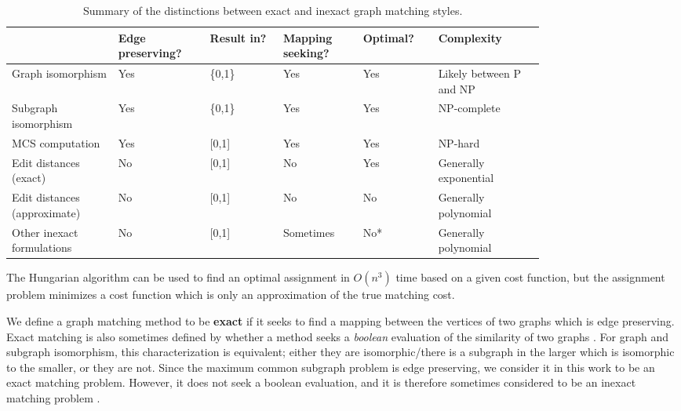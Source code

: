 \documentclass[12pt]{thesis}
\theoremstyle{plain}
\theoremstyle{definition}
\theoremstyle{remark}
\begin{document}
\begin{table}[h]
\centering
\begin{tabular}{|L{0.16\linewidth}|L{0.13\linewidth}|L{0.11\linewidth}|L{0.12\linewidth}|L{0.105\linewidth}|L{0.165\linewidth}|}
\hline
 & Edge preserving? & Result in? & Mapping seeking? & Optimal? & Complexity \\ \hline
Graph isomorphism & Yes & \{0,1\} & Yes & Yes & Likely between P and NP \\ \hline
Subgraph isomorphism & Yes & \{0,1\} & Yes & Yes & NP-complete \\ \hline
MCS computation & Yes & [0,1] & Yes & Yes & NP-hard \\ \hline
Edit distances (exact) & No & [0,1] & No & Yes & Generally exponential \\ \hline
Edit distances (approximate) & No & [0,1] & No & No & Generally polynomial \\ \hline
Other inexact formulations & No & [0,1] & Sometimes & No* & Generally polynomial \\ \hline
\end{tabular}
\caption{Summary of the distinctions between exact and inexact graph matching styles.}
\footnotesize *The Hungarian algorithm can be used to find an optimal assignment in $O(n^3)$ time based on a given cost function, but the assignment problem minimizes a cost function which is only an approximation of the true matching cost.
\label{exact_vs_inexact}
\end{table}

We define a graph matching method to be \textbf{exact} if it seeks to find a mapping between the vertices of two graphs which is edge preserving. Exact matching is also sometimes defined by whether a method seeks a \textit{boolean} evaluation of the similarity of two graphs \cite{Livi_2012,Emmert_Streib_2016}. For graph and subgraph isomorphism, this characterization is equivalent; either they are isomorphic/there is a subgraph in the larger which is isomorphic to the smaller, or they are not. Since the maximum common subgraph problem is edge preserving, we consider it in this work to be an exact matching problem. However, it does not seek a boolean evaluation, and it is therefore sometimes considered to be an inexact matching problem \cite{Livi_2012}. 
\end{document}
